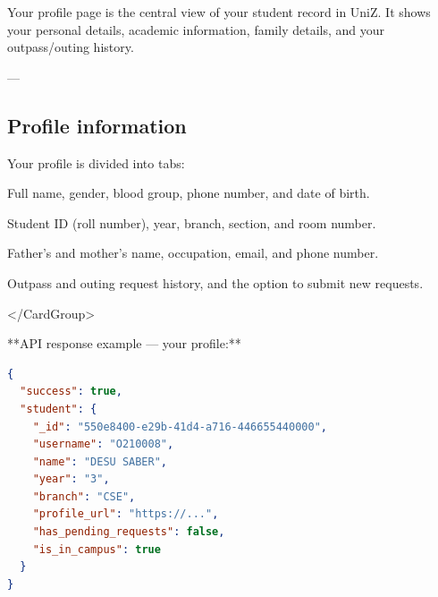 


Your profile page is the central view of your student record in UniZ. It shows your personal details, academic information, family details, and your outpass/outing history.

---

\subsection{Profile information}

Your profile is divided into tabs:


\begin{tcolorbox}[colback=gray!5,colframe=primary,title=Documentation Note]

  
\begin{tcolorbox}[colback=gray!5,colframe=primary,title=Documentation Note]

    Full name, gender, blood group, phone number, and date of birth.
  
\end{tcolorbox}

  
\begin{tcolorbox}[colback=gray!5,colframe=primary,title=Documentation Note]

    Student ID (roll number), year, branch, section, and room number.
  
\end{tcolorbox}

  
\begin{tcolorbox}[colback=gray!5,colframe=primary,title=Documentation Note]

    Father's and mother's name, occupation, email, and phone number.
  
\end{tcolorbox}

  
\begin{tcolorbox}[colback=gray!5,colframe=primary,title=Documentation Note]

    Outpass and outing request history, and the option to submit new requests.
  
\end{tcolorbox}

</CardGroup>

**API response example — your profile:**

\begin{lstlisting}[language=json]
{
  "success": true,
  "student": {
    "_id": "550e8400-e29b-41d4-a716-446655440000",
    "username": "O210008",
    "name": "DESU SABER",
    "year": "3",
    "branch": "CSE",
    "profile_url": "https://...",
    "has_pending_requests": false,
    "is_in_campus": true
  }
}


\end{lstlisting}
\end{tcolorbox}
